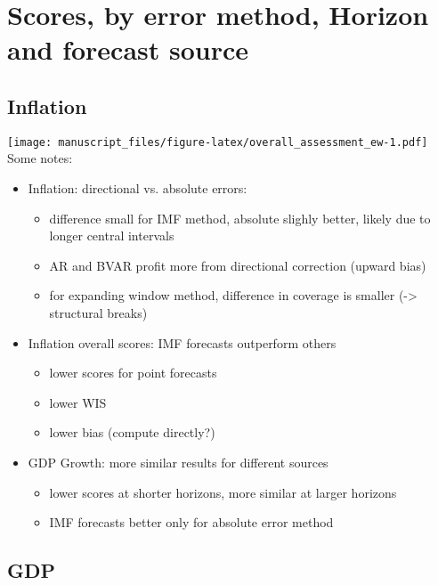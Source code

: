 \documentclass[
]{article}
\begin{document}
\hypertarget{scores-by-error-method-horizon-and-forecast-source}{%
\section{Scores, by error method, Horizon and forecast source}\label{scores-by-error-method-horizon-and-forecast-source}}

\hypertarget{inflation}{%
\subsection{Inflation}\label{inflation}}

\texttt{[image: manuscript\_files/figure-latex/overall\_assessment\_ew-1.pdf]}
\newpage
Some notes:

\begin{itemize}
\item Inflation: directional vs. absolute errors:
\begin{itemize}
\item difference small for IMF method, absolute slighly better, likely due to longer central intervals
\item AR and BVAR profit more from directional correction (upward bias)
\item for expanding window method, difference in coverage is smaller (-> structural breaks)

\end{itemize}
\item Inflation overall scores: IMF forecasts outperform others
\begin{itemize}
\item lower scores for point forecasts
\item lower WIS 
\item lower bias (compute directly?)
\end{itemize}


\item GDP Growth: more similar results for different sources
\begin{itemize}
\item lower scores at shorter horizons, more similar at larger horizons
\item IMF forecasts better only for absolute error method
\end{itemize}
\end{itemize}

\newpage

\hypertarget{gdp}{%
\subsection{GDP}\label{gdp}}
\end{document}

